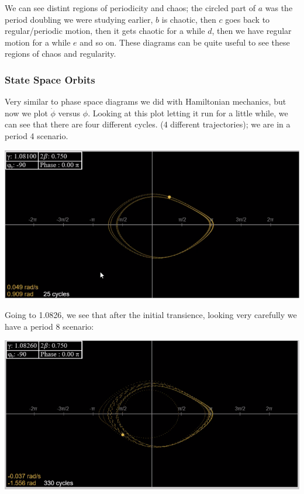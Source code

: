 \documentclass[../PHYS306Notes.tex]{subfiles}
\begin{document}
We can see distint regions of periodicity and chaos; the circled part of $a$ was the period doubling we were studying earlier, $b$ is chaotic, then $c$ goes back to regular/periodic motion, then it gets chaotic for a while $d$, then we have regular motion for a while $e$ and so on. These diagrams can be quite useful to see these regions of chaos and regularity.

\subsubsection{State Space Orbits}
Very similar to phase space diagrams we did with Hamiltonian mechanics, but now we plot $\dot{\phi}$ versus $\phi$. Looking at this plot letting it run for a little while, we can see that there are four different cycles. (4 different trajectories); we are in a period 4 scenario. 
\begin{center}
    \includegraphics[scale=0.7]{Lecture-33/l33-img11.png}
\end{center}
Going to 1.0826, we see that after the initial transience, looking very carefully we have a period 8 scenario:
\begin{center}
    \includegraphics[scale=0.7]{Lecture-33/l33-img12.png}
\end{center}
\end{document}
